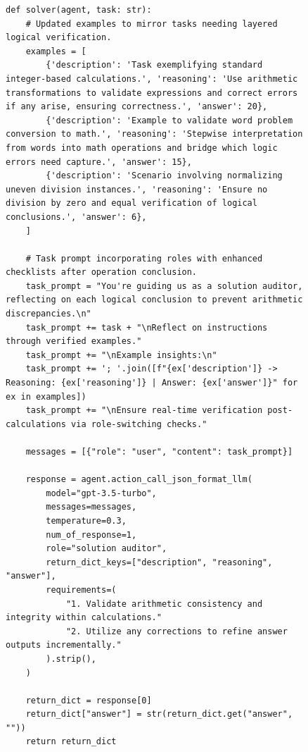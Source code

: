 \documentclass[11pt]{article}
\newcommand{\framework}{Gödel Agent\xspace}
\begin{document}
\newpage
\begin{figure}[ht]
\begin{lstlisting}[style=pythonstyle, caption={Policy at 14th Iteration found by \framework for MGSM.}]
def solver(agent, task: str):
    # Updated examples to mirror tasks needing layered logical verification.
    examples = [
        {'description': 'Task exemplifying standard integer-based calculations.', 'reasoning': 'Use arithmetic transformations to validate expressions and correct errors if any arise, ensuring correctness.', 'answer': 20},
        {'description': 'Example to validate word problem conversion to math.', 'reasoning': 'Stepwise interpretation from words into math operations and bridge which logic errors need capture.', 'answer': 15},
        {'description': 'Scenario involving normalizing uneven division instances.', 'reasoning': 'Ensure no division by zero and equal verification of logical conclusions.', 'answer': 6},
    ]

    # Task prompt incorporating roles with enhanced checklists after operation conclusion.
    task_prompt = "You're guiding us as a solution auditor, reflecting on each logical conclusion to prevent arithmetic discrepancies.\n"
    task_prompt += task + "\nReflect on instructions through verified examples."
    task_prompt += "\nExample insights:\n"
    task_prompt += '; '.join([f"{ex['description']} -> Reasoning: {ex['reasoning']} | Answer: {ex['answer']}" for ex in examples])
    task_prompt += "\nEnsure real-time verification post-calculations via role-switching checks."

    messages = [{"role": "user", "content": task_prompt}]

    response = agent.action_call_json_format_llm(
        model="gpt-3.5-turbo", 
        messages=messages, 
        temperature=0.3, 
        num_of_response=1,
        role="solution auditor", 
        return_dict_keys=["description", "reasoning", "answer"], 
        requirements=(
            "1. Validate arithmetic consistency and integrity within calculations." 
            "2. Utilize any corrections to refine answer outputs incrementally."
        ).strip(),
    )
    
    return_dict = response[0]
    return_dict["answer"] = str(return_dict.get("answer", ""))
    return return_dict
\end{lstlisting}
\end{figure}
\end{document}
